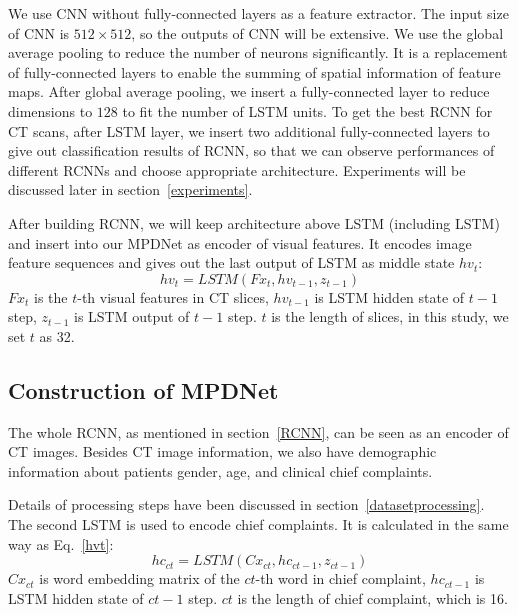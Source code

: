 \documentclass[journal]{IEEEtran}
\begin{document}
We use CNN without fully-connected layers as a feature extractor. The input size of CNN is $512 \times 512$, so the outputs of CNN will be extensive. We use the global average pooling \cite{lin2014network} to reduce the number of neurons significantly. It is a replacement of fully-connected layers to enable the summing of spatial information of feature maps. After global average pooling, we insert a fully-connected layer to reduce dimensions to $128$ to fit the number of LSTM units.
To get the best RCNN for CT scans, after LSTM layer, we insert two additional fully-connected layers to give out classification results of RCNN, so that we can observe performances of different RCNNs and choose appropriate architecture. Experiments will be discussed later in section~\ref{experiments}.

After building RCNN, we will keep architecture above LSTM (including LSTM) and insert into our MPDNet as encoder of visual features. It encodes image feature sequences and gives out the last output of LSTM as middle state $hv_t$:
\begin{equation}
hv_t = LSTM(Fx_t, hv_{t-1}, z_{t-1})
\label{hvt}
\end{equation}
$Fx_t$ is the $t$-th visual features in CT slices, $hv_{t-1}$ is LSTM hidden state of $t-1$ step, $z_{t-1}$ is LSTM output of $t-1$ step. $t$ is the length of slices, in this study, we set $t$ as 32.

\subsection{Construction of MPDNet}
\label{MMDDtxt}
The whole RCNN, as mentioned in section~\ref{RCNN}, can be seen as an encoder of CT images.
Besides CT image information, we also have demographic information about patients gender, age, and clinical chief complaints. 

Details of processing steps have been discussed in section~\ref{datasetprocessing}. The second LSTM is used to encode chief complaints. It is calculated in the same way as Eq.~\ref{hvt}:
\begin{equation}
    hc_{ct} = LSTM(Cx_{ct}, hc_{ct-1}, z_{ct-1})
    \label{hct}
\end{equation}
$Cx_{ct}$ is word embedding matrix of the $ct$-th word in chief complaint, $hc_{ct-1}$ is LSTM hidden state of $ct-1$ step. $ct$ is the length of chief complaint, which is 16. 
\end{document}
